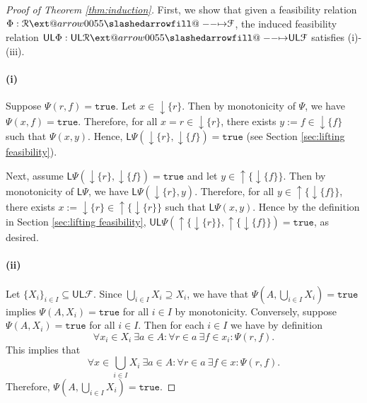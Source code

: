 \documentclass[12pt]{article}
\makeatletter
\theoremstyle{definition}
\theoremstyle{plain}
\theoremstyle{plain}
\theoremstyle{plain}
\theoremstyle{plain}
\theoremstyle{remark}
\theoremstyle{remark}
\newcommand{\mc}[1]{\mathcal{#1}}
\newcommand{\sub}{\subseteq}
\newcommand{\low}{\mathsf{L}}
\newcommand{\upper}{\mathsf{U}}
\newcommand{\true}{\mathtt{true}}
\newcommand{\upc}[1]{{\uparrow #1}}
\newcommand{\lwc}[1]{{\downarrow #1}}
\def\slashedarrowfill@#1#2#3#4#5{%
	$\m@th\thickmuskip0mu\medmuskip\thickmuskip\thinmuskip\thickmuskip
	\relax#5#1\mkern-7mu%
	\cleaders\hbox{$#5\mkern-2mu#2\mkern-2mu$}\hfill
	\mathclap{#3}\mathclap{#2}%
	\cleaders\hbox{$#5\mkern-2mu#2\mkern-2mu$}\hfill
	\mkern-7mu#4$%
}
\def\rightslashedarrowfill@{%
	\slashedarrowfill@\relbar\relbar\mapstochar\rightarrow}
\newcommand\xslashedrightarrow[2][]{%
	\ext@arrow 0055{\rightslashedarrowfill@}{#1}{#2}}
\makeatother
\begin{document}
\newpage
\begin{proof}[Proof of Theorem \ref{thm:induction}]
	First, we show that given a feasibility relation $\Phi: \mc{R} \xslashedrightarrow{} \mc{F}$, the induced feasibility relation $\upper\low\Phi:  \upper\low\mc{R} \xslashedrightarrow{} \upper\low\mc{F}$ satisfies (i)-(iii).
	
	\paragraph{(i)} Suppose $\Psi(r,f) = \true$. Let $x \in \lwc{\{r\}}$. Then by monotonicity of $\Psi$, we have $\Psi(x,f) = \true$. Therefore, for all $x = r \in \lwc{\{r\}}$, there exists $y := f \in \lwc{\{f\}}$ such that $\Psi(x,y)$. Hence, $\low\Psi(\lwc{\{r\}}, \lwc{\{f\}}) = \true$ (see Section \ref{sec:lifting feasibility}).
	
	Next, assume $\low\Psi(\lwc{\{r\}}, \lwc{\{f\}}) = \true$ and let $y \in \upc\{\lwc\{f\} \}$. Then by monotonicity of $\low\Psi$, we have $\low\Psi(\lwc{\{r\}},y)$. Therefore, for all $y \in \upc\{\lwc\{f\} \}$, there exists $x :=  \lwc{\{r\}} \in \upc\{\lwc\{r\} \}$ such that $\low\Psi(x,y)$. Hence by the definition in Section \ref{sec:lifting feasibility}, $\upper\low\Psi( \upc\{\lwc\{r\} \} ,\upc\{\lwc\{f\} \}) = \true$, as desired.
	
	\paragraph{(ii)} Let $\{X_i\}_{i \in I} \sub \upper\low\mc{F}$. Since $\bigcup_{i \in I} X_i \supseteq X_i$, we have that $\Psi(A, \bigcup_{i \in I} X_i) = \true $ implies $\Psi(A,  X_i) = \true $ for all $i \in I$ by monotonicity. Conversely, suppose $\Psi(A,  X_i) = \true $ for all $i \in I$. Then for each $i \in I$ we have by definition
	$$\forall x_i \in X_i \: \exists a \in A : \forall r \in a \: \exists f \in x_i : \Psi(r,f).$$
	This implies that
	$$\forall x \in \bigcup_{i \in I} X_i \: \exists a \in A : \forall r \in a \: \exists f \in x : \Psi(r,f).$$
	Therefore, $\Psi(A, \bigcup_{i \in I} X_i) = \true $.
	

\end{proof}
\end{document}
